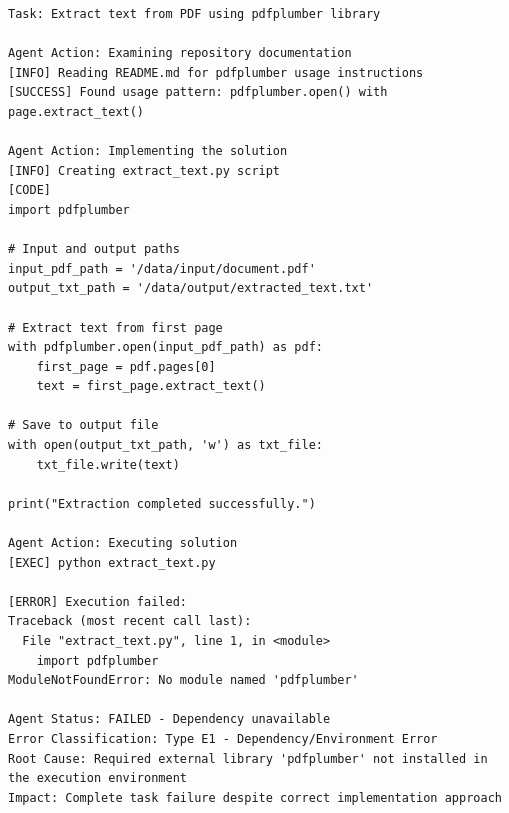 \begin{lstlisting}[language={},caption={Pdfplumber execution failed due to missing external dependency.},label={lst:scrapy-execution}]
Task: Extract text from PDF using pdfplumber library

Agent Action: Examining repository documentation
[INFO] Reading README.md for pdfplumber usage instructions
[SUCCESS] Found usage pattern: pdfplumber.open() with page.extract_text()

Agent Action: Implementing the solution
[INFO] Creating extract_text.py script
[CODE] 
import pdfplumber

# Input and output paths
input_pdf_path = '/data/input/document.pdf'
output_txt_path = '/data/output/extracted_text.txt'

# Extract text from first page
with pdfplumber.open(input_pdf_path) as pdf:
    first_page = pdf.pages[0]
    text = first_page.extract_text()

# Save to output file
with open(output_txt_path, 'w') as txt_file:
    txt_file.write(text)

print("Extraction completed successfully.")

Agent Action: Executing solution
[EXEC] python extract_text.py

[ERROR] Execution failed:
Traceback (most recent call last):
  File "extract_text.py", line 1, in <module>
    import pdfplumber
ModuleNotFoundError: No module named 'pdfplumber'

Agent Status: FAILED - Dependency unavailable
Error Classification: Type E1 - Dependency/Environment Error
Root Cause: Required external library 'pdfplumber' not installed in the execution environment
Impact: Complete task failure despite correct implementation approach
\end{lstlisting}

